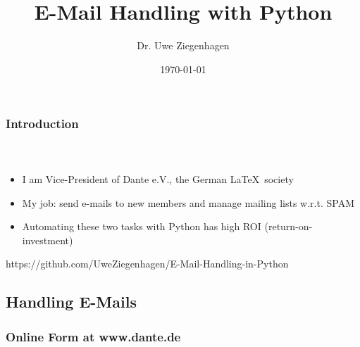 \documentclass[12pt,ngerman]{beamer}
\title{E-Mail Handling with Python}
\date{\today}
\author{Dr. Uwe Ziegenhagen}
\institute{www.uweziegenhagen.de}
\begin{document}
 
\begin{frame}
	 \maketitle
\end{frame}
 
\begin{frame}
\frametitle{Introduction}
\framesubtitle{~}
 
\begin{itemize}
\item I am Vice-President of Dante e.V., the German \LaTeX\  society
\item My job: send e-mails to new members and manage mailing lists w.r.t. SPAM
\item Automating these two tasks with Python has high ROI (return-on-investment)
\end{itemize}


\begin{center}
https://github.com/UweZiegenhagen/E-Mail-Handling-in-Python
\end{center}

\end{frame}

\begin{frame}

\section{Handling E-Mails}

\end{frame}


\begin{frame}
\frametitle{Online Form at www.dante.de}

\begin{center}
\end{center}

\end{frame}
\end{document}
